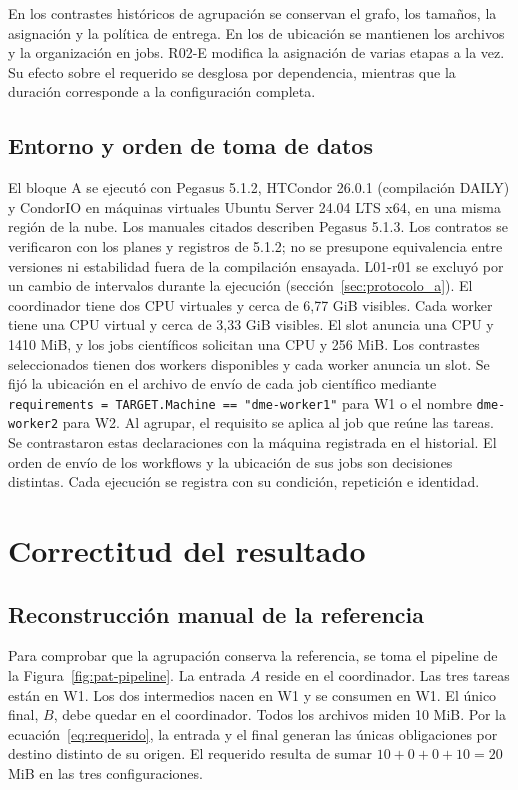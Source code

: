 En los contrastes históricos de agrupación se conservan el grafo, los tamaños, la asignación y la política de entrega. En los de ubicación se mantienen los archivos y la organización en jobs. R02-E modifica la asignación de varias etapas a la vez. Su efecto sobre el requerido se desglosa por dependencia, mientras que la duración corresponde a la configuración completa.

\subsection{Entorno y orden de toma de datos}
El bloque A se ejecutó con Pegasus 5.1.2, HTCondor 26.0.1 (compilación DAILY) y CondorIO en máquinas virtuales Ubuntu Server 24.04 LTS x64, en una misma región de la nube. Los manuales citados describen Pegasus 5.1.3. Los contratos se verificaron con los planes y registros de 5.1.2; no se presupone equivalencia entre versiones ni estabilidad fuera de la compilación ensayada. L01-r01 se excluyó por un cambio de intervalos durante la ejecución (sección~\ref{sec:protocolo_a}). El coordinador tiene dos CPU virtuales y cerca de 6,77 GiB visibles. Cada worker tiene una CPU virtual y cerca de 3,33 GiB visibles. El slot anuncia una CPU y 1410 MiB, y los jobs científicos solicitan una CPU y 256 MiB. Los contrastes seleccionados tienen dos workers disponibles y cada worker anuncia un slot. Se fijó la ubicación en el archivo de envío de cada job científico mediante \texttt{requirements = TARGET.Machine == "dme-worker1"} para W1 o el nombre \texttt{dme-worker2} para W2. Al agrupar, el requisito se aplica al job que reúne las tareas. Se contrastaron estas declaraciones con la máquina registrada en el historial. El orden de envío de los workflows y la ubicación de sus jobs son decisiones distintas. Cada ejecución se registra con su condición, repetición e identidad.





\section{Correctitud del resultado}
\subsection{Reconstrucción manual de la referencia}
Para comprobar que la agrupación conserva la referencia, se toma el pipeline de la Figura~\ref{fig:pat-pipeline}. La entrada $A$ reside en el coordinador. Las tres tareas están en W1. Los dos intermedios nacen en W1 y se consumen en W1. El único final, $B$, debe quedar en el coordinador. Todos los archivos miden 10 MiB. Por la ecuación~\eqref{eq:requerido}, la entrada y el final generan las únicas obligaciones por destino distinto de su origen. El requerido resulta de sumar $10+0+0+10=20$ MiB en las tres configuraciones.



